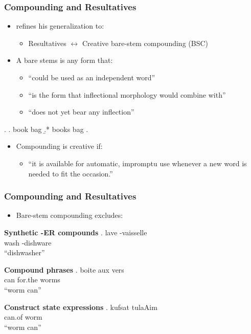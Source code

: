 \documentclass[Proposal]{subfiles}
\begin{document}
\begin{frame}
  \frametitle{Compounding and Resultatives}
  \begin{itemize}
    \item \textcite{snyder2016compound} refines his generalization to:
      \begin{itemize}
	\item Resultatives $\leftrightarrow$ Creative bare-stem compounding (BSC)
      \end{itemize}
    \item A bare stems is any form that:
      \begin{itemize}
	\item ``could be used as an independent word''
	\item ``is the  form that inflectional morphology would combine with''
	\item ``does not yet bear any inflection'' \hfill\parencite{snyder2016compound}
      \end{itemize}
  \end{itemize}
  \ex. 
  \a. {\rm book bag}
  \b.* {\rm books bag}
  \z.

  \begin{itemize}
    \item Compounding is creative if:
      \begin{itemize}
	\item ``it is available for automatic, impromptu use whenever a new word is needed to fit the occasion.'' \parencite{snyder2016compound}
      \end{itemize}
  \end{itemize}
\end{frame}
\begin{frame}
  \frametitle{Compounding and Resultatives}
  \begin{itemize}
    \item Bare-stem compounding excludes:
  \end{itemize}
  \begin{overprint}
    \textbf{Synthetic -ER compounds}
    \exg. lave -vaisselle \parencite[French,][]{snyder2016compound}\\
    wash -dishware\\
    ``dishwasher'' 

    \textbf{Compound phrases}
    \exg. boite aux vers \parencite[French,][]{snyder2016compound}\\
    can for.the worms\\
    ``worm can''

    \textbf{Construct state expressions}
    \exg. kufsat tulaAim \parencite[Hebrew,][]{snyder2016compound}\\
    can.of worm\\
    ``worm can''

  \end{overprint}
\end{frame}
\end{document}
